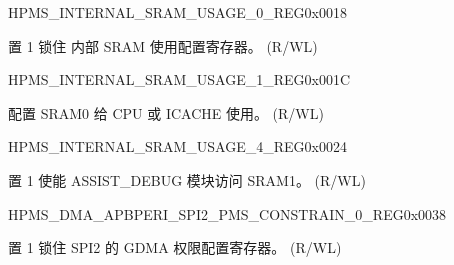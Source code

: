 \begin{register}{H}{PMS\_INTERNAL\_SRAM\_USAGE\_0\_REG}{0x0018}\label{regdesc:PMSINTERNALSRAMUSAGE0REG}
%
%
\regnewline%
\begin{regdesc}\begin{reglist}
\label{fielddesc:PMSINTERNALSRAMUSAGELOCK}\item [PMS\_INTERNAL\_SRAM\_USAGE\_LOCK] 置 1 锁住 内部 SRAM 使用配置寄存器。 (R/WL)
\end{reglist}\end{regdesc}
\end{register}


\begin{register}{H}{PMS\_INTERNAL\_SRAM\_USAGE\_1\_REG}{0x001C}\label{regdesc:PMSINTERNALSRAMUSAGE1REG}
%
%
%
\regnewline%
\begin{regdesc}\begin{reglist}
\label{fielddesc:PMSINTERNALSRAMUSAGECPUCACHE}\item [PMS\_INTERNAL\_SRAM\_USAGE\_CPU\_CACHE] 配置 SRAM0 给 CPU 或 ICACHE 使用。 (R/WL)
\end{reglist}\end{regdesc}
\end{register}

\begin{register}{H}{PMS\_INTERNAL\_SRAM\_USAGE\_4\_REG}{0x0024}\label{regdesc:PMSINTERNALSRAMUSAGE4REG}
%
%
\regnewline%
\begin{regdesc}\begin{reglist}
\label{fielddesc:PMSINTERNALSRAMUSAGELOGSRAM}\item [PMS\_INTERNAL\_SRAM\_USAGE\_LOG\_SRAM] 置 1 使能 ASSIST\_DEBUG 模块访问 SRAM1。 (R/WL)
\end{reglist}\end{regdesc}
\end{register}


\begin{register}{H}{PMS\_DMA\_APBPERI\_SPI2\_PMS\_CONSTRAIN\_0\_REG}{0x0038}\label{regdesc:PMSDMAAPBPERISPI2PMSCONSTRAIN0REG}
%
%
\regnewline%
\begin{regdesc}\begin{reglist}
\label{fielddesc:PMSDMAAPBPERISPI2PMSCONSTRAINLOCK}\item [PMS\_DMA\_APBPERI\_SPI2\_PMS\_CONSTRAIN\_LOCK] 置 1 锁住 SPI2 的 GDMA 权限配置寄存器。 (R/WL)
\end{reglist}\end{regdesc}
\end{register}



